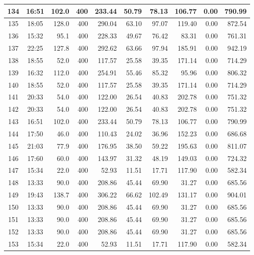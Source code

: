 \begin{landscape}
\begin{longtable}{|c|c|r|r|r|r|r|r|r|r|}
\hline
134 & 16:51 & 102.0 & 400 & 233.44 & 50.79 & 78.13 & 106.77 & 0.00 & 790.99 \\
\hline
\rowcolor{gray!8}
135 & 18:05 & 128.0 & 400 & 290.04 & 63.10 & 97.07 & 119.40 & 0.00 & 872.54 \\
\hline
136 & 15:32 & 95.1 & 400 & 228.33 & 49.67 & 76.42 & 83.31 & 0.00 & 761.31 \\
\hline
\rowcolor{gray!8}
137 & 22:25 & 127.8 & 400 & 292.62 & 63.66 & 97.94 & 185.91 & 0.00 & 942.19 \\
\hline
138 & 18:55 & 52.0 & 400 & 117.57 & 25.58 & 39.35 & 171.14 & 0.00 & 714.29 \\
\hline
\rowcolor{gray!8}
139 & 16:32 & 112.0 & 400 & 254.91 & 55.46 & 85.32 & 95.96 & 0.00 & 806.32 \\
\hline
140 & 18:55 & 52.0 & 400 & 117.57 & 25.58 & 39.35 & 171.14 & 0.00 & 714.29 \\
\hline
\rowcolor{gray!8}
141 & 20:33 & 54.0 & 400 & 122.00 & 26.54 & 40.83 & 202.78 & 0.00 & 751.32 \\
\hline
142 & 20:33 & 54.0 & 400 & 122.00 & 26.54 & 40.83 & 202.78 & 0.00 & 751.32 \\
\hline
\rowcolor{gray!8}
143 & 16:51 & 102.0 & 400 & 233.44 & 50.79 & 78.13 & 106.77 & 0.00 & 790.99 \\
\hline
144 & 17:50 & 46.0 & 400 & 110.43 & 24.02 & 36.96 & 152.23 & 0.00 & 686.68 \\
\hline
\rowcolor{gray!8}
145 & 21:03 & 77.9 & 400 & 176.95 & 38.50 & 59.22 & 195.63 & 0.00 & 811.07 \\
\hline
146 & 17:60 & 60.0 & 400 & 143.97 & 31.32 & 48.19 & 149.03 & 0.00 & 724.32 \\
\hline
\rowcolor{gray!8}
147 & 15:34 & 22.0 & 400 & 52.93 & 11.51 & 17.71 & 117.90 & 0.00 & 582.34 \\
\hline
148 & 13:33 & 90.0 & 400 & 208.86 & 45.44 & 69.90 & 31.27 & 0.00 & 685.56 \\
\hline
\rowcolor{gray!8}
149 & 19:43 & 138.7 & 400 & 306.22 & 66.62 & 102.49 & 131.17 & 0.00 & 904.01 \\
\hline
150 & 13:33 & 90.0 & 400 & 208.86 & 45.44 & 69.90 & 31.27 & 0.00 & 685.56 \\
\hline
\rowcolor{gray!8}
151 & 13:33 & 90.0 & 400 & 208.86 & 45.44 & 69.90 & 31.27 & 0.00 & 685.56 \\
\hline
152 & 13:33 & 90.0 & 400 & 208.86 & 45.44 & 69.90 & 31.27 & 0.00 & 685.56 \\
\hline
\rowcolor{gray!8}
153 & 15:34 & 22.0 & 400 & 52.93 & 11.51 & 17.71 & 117.90 & 0.00 & 582.34 \\

\end{longtable}
\end{landscape}
